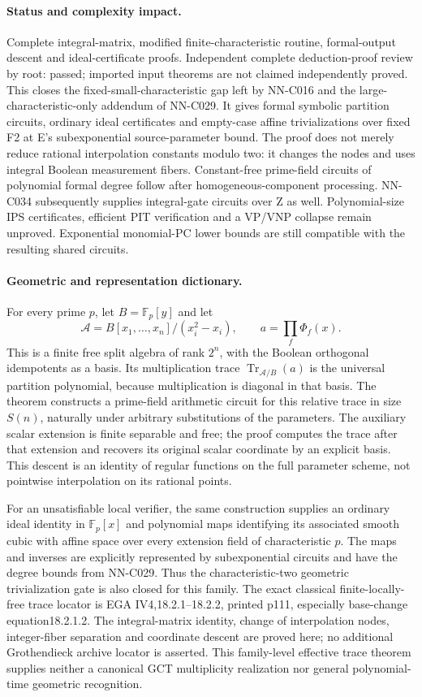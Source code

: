 \paragraph{Status and complexity impact.}
Complete integral-matrix, modified finite-characteristic routine, formal-output descent and ideal-certificate proofs. Independent complete deduction-proof review by root: passed; imported input theorems are not claimed independently proved. This closes the fixed-small-characteristic gap left by NN-C016 and the large-characteristic-only addendum of NN-C029. It gives formal symbolic partition circuits, ordinary ideal certificates and empty-case affine trivializations over fixed F2 at E's subexponential source-parameter bound. The proof does not merely reduce rational interpolation constants modulo two: it changes the nodes and uses integral Boolean measurement fibers. Constant-free prime-field circuits of polynomial formal degree follow after homogeneous-component processing. NN-C034 subsequently supplies integral-gate circuits over Z as well. Polynomial-size IPS certificates, efficient PIT verification and a VP/VNP collapse remain unproved. Exponential monomial-PC lower bounds are still compatible with the resulting shared circuits.

\paragraph{Geometric and representation dictionary.}
For every prime $p$, let $B=\mathbb F_p[y]$ and let
\[
 \mathscr A=B[x_1,\ldots,x_n]/(x_i^2-x_i),\qquad
       a=\prod_f\Phi_f(x).
\]
This is a finite free split algebra of rank $2^n$, with the Boolean orthogonal idempotents as a basis. Its multiplication trace $\operatorname{Tr}_{\mathscr A/B}(a)$ is the universal partition polynomial, because multiplication is diagonal in that basis. The theorem constructs a prime-field arithmetic circuit for this relative trace in size $S(n)$, naturally under arbitrary substitutions of the parameters. The auxiliary scalar extension is finite separable and free; the proof computes the trace after that extension and recovers its original scalar coordinate by an explicit basis. This descent is an identity of regular functions on the full parameter scheme, not pointwise interpolation on its rational points.

For an unsatisfiable local verifier, the same construction supplies an ordinary ideal identity in $\mathbb F_p[x]$ and polynomial maps identifying its associated smooth cubic with affine space over every extension field of characteristic $p$. The maps and inverses are explicitly represented by subexponential circuits and have the degree bounds from NN-C029. Thus the characteristic-two geometric trivialization gate is also closed for this family. The exact classical finite-locally-free trace locator is EGA IV4,18.2.1--18.2.2, printed p111, especially base-change equation18.2.1.2. The integral-matrix identity, change of interpolation nodes, integer-fiber separation and coordinate descent are proved here; no additional Grothendieck archive locator is asserted. This family-level effective trace theorem supplies neither a canonical GCT multiplicity realization nor general polynomial-time geometric recognition.




